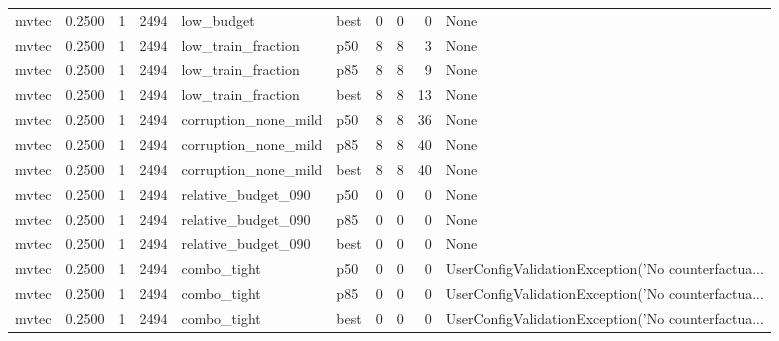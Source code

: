 \begin{tabular}{lrrrllrrrl}
   mvtec &    0.2500 &    1 &   2494 &           low\_budget &   best &               0 &          0 &       0 &                                               None \\
   mvtec &    0.2500 &    1 &   2494 &   low\_train\_fraction &    p50 &               8 &          8 &       3 &                                               None \\
   mvtec &    0.2500 &    1 &   2494 &   low\_train\_fraction &    p85 &               8 &          8 &       9 &                                               None \\
   mvtec &    0.2500 &    1 &   2494 &   low\_train\_fraction &   best &               8 &          8 &      13 &                                               None \\
   mvtec &    0.2500 &    1 &   2494 & corruption\_none\_mild &    p50 &               8 &          8 &      36 &                                               None \\
   mvtec &    0.2500 &    1 &   2494 & corruption\_none\_mild &    p85 &               8 &          8 &      40 &                                               None \\
   mvtec &    0.2500 &    1 &   2494 & corruption\_none\_mild &   best &               8 &          8 &      40 &                                               None \\
   mvtec &    0.2500 &    1 &   2494 &  relative\_budget\_090 &    p50 &               0 &          0 &       0 &                                               None \\
   mvtec &    0.2500 &    1 &   2494 &  relative\_budget\_090 &    p85 &               0 &          0 &       0 &                                               None \\
   mvtec &    0.2500 &    1 &   2494 &  relative\_budget\_090 &   best &               0 &          0 &       0 &                                               None \\
   mvtec &    0.2500 &    1 &   2494 &          combo\_tight &    p50 &               0 &          0 &       0 & UserConfigValidationException('No counterfactua... \\
   mvtec &    0.2500 &    1 &   2494 &          combo\_tight &    p85 &               0 &          0 &       0 & UserConfigValidationException('No counterfactua... \\
   mvtec &    0.2500 &    1 &   2494 &          combo\_tight &   best &               0 &          0 &       0 & UserConfigValidationException('No counterfactua... \\

\end{tabular}
